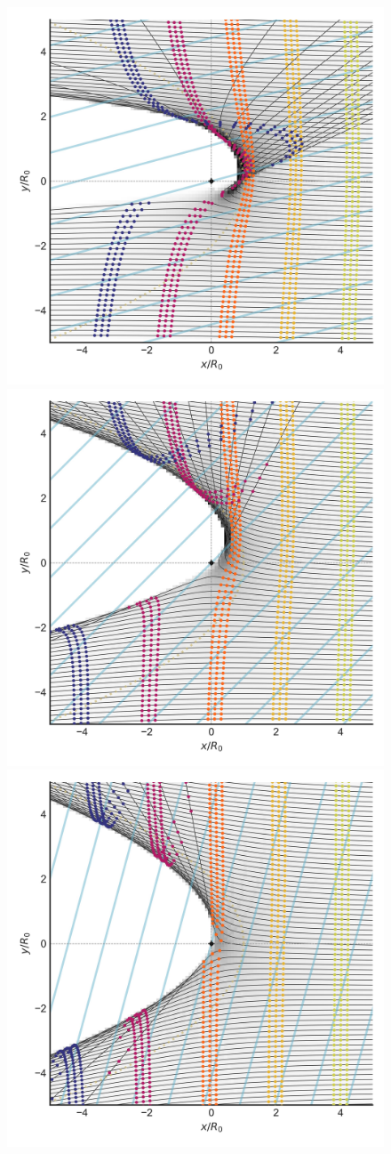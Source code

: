 \begin{figure}
  
  \includegraphics[width=0.8\linewidth]{figs/dust-bfield-stream-b15-z0000}
  \includegraphics[width=0.8\linewidth]{figs/dust-bfield-stream-b45-z0000}
  \includegraphics[width=0.8\linewidth]{figs/dust-bfield-stream-b75-z0000}

\end{figure}
